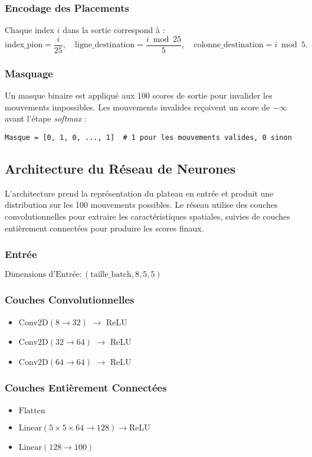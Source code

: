 \documentclass[]{article}
\begin{document}
\subsubsection{Encodage des Placements}
Chaque index \(i\) dans la sortie correspond à :
\[
\text{index\_pion} = \frac{i}{25}, \quad
\text{ligne\_destination} = \frac{i \bmod 25}{5}, \quad
\text{colonne\_destination} = i \bmod 5.
\]

\subsubsection{Masquage}
Un masque binaire est appliqué aux 100 scores de sortie pour invalider les mouvements impossibles. Les mouvements invalides reçoivent un score de \(-\infty\) avant l'étape \textit{softmax} :
\begin{verbatim}
Masque = [0, 1, 0, ..., 1]  # 1 pour les mouvements valides, 0 sinon
\end{verbatim}

\subsection{Architecture du Réseau de Neurones}
L'architecture prend la représentation du plateau en entrée et produit une distribution sur les 100 mouvements possibles. Le réseau utilise des couches convolutionnelles pour extraire les caractéristiques spatiales, suivies de couches entièrement connectées pour produire les scores finaux.

\subsubsection{Entrée}
\(\text{Dimensions d'Entrée}: (\text{taille\_batch}, 8, 5, 5)\)

\subsubsection{Couches Convolutionnelles}
\begin{itemize}
    \item \(\text{Conv2D}(8 \rightarrow 32)\) \(\rightarrow\) ReLU
    \item \(\text{Conv2D}(32 \rightarrow 64)\) \(\rightarrow\) ReLU
    \item \(\text{Conv2D}(64 \rightarrow 64)\) \(\rightarrow\) ReLU
\end{itemize}

\subsubsection{Couches Entièrement Connectées}
\begin{itemize}
    \item \(\text{Flatten}\)
    \item \(\text{Linear}(5 \times 5 \times 64 \rightarrow 128) \rightarrow \text{ReLU}\)
    \item \(\text{Linear}(128 \rightarrow 100)\)
\end{itemize}
\end{document}
